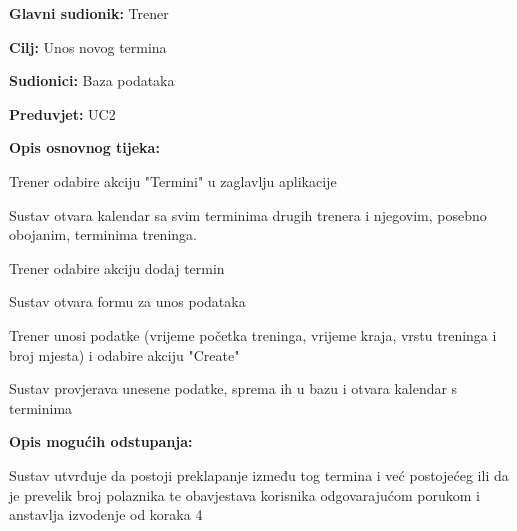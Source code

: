 					\noindent {}			\begin{packed_item}
						
						\item \textbf{Glavni sudionik: }Trener
						\item  \textbf{Cilj:} Unos novog termina
						\item  \textbf{Sudionici:} Baza podataka
						\item  \textbf{Preduvjet:} UC2
						\item  \textbf{Opis osnovnog tijeka:}
						
						\item[] \begin{packed_enum}
							
							\item Trener odabire akciju "Termini" u zaglavlju aplikacije 
							\item Sustav otvara kalendar sa svim terminima drugih trenera i njegovim, posebno obojanim, terminima treninga.
							\item Trener odabire akciju dodaj termin
							\item Sustav otvara formu za unos podataka
							\item Trener unosi podatke (vrijeme početka treninga, vrijeme kraja, vrstu treninga i broj mjesta) i odabire akciju "Create"
							\item Sustav provjerava unesene podatke, sprema ih u bazu i otvara kalendar s terminima
							
							
						\end{packed_enum}
						
						\item  \textbf{Opis mogućih odstupanja:}
						
						\begin{packed_enum}
							
							\item[6.a] Sustav utvrđuje da postoji preklapanje između tog termina i već postojećeg ili da je prevelik broj polaznika te obavjestava korisnika odgovarajućom porukom i anstavlja izvodenje od koraka 4
							
						\end{packed_enum}
						
					\end{packed_item}
					
					
				   	\noindent {}
				   		
